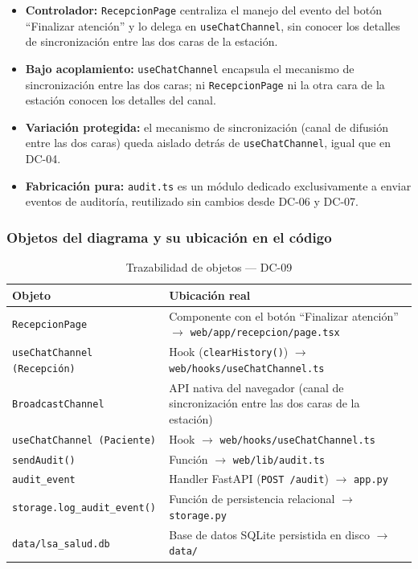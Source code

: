\begin{itemize}[leftmargin=*, itemsep=2pt]
    \item \textbf{Controlador:} \texttt{RecepcionPage} centraliza el manejo
    del evento del botón ``Finalizar atención'' y lo delega en
    \texttt{useChatChannel}, sin conocer los detalles de sincronización
    entre las dos caras de la estación.
    \item \textbf{Bajo acoplamiento:} \texttt{useChatChannel} encapsula el
    mecanismo de sincronización entre las dos caras; ni \texttt{RecepcionPage}
    ni la otra cara de la estación conocen los detalles del canal.
    \item \textbf{Variación protegida:} el mecanismo de sincronización
    (canal de difusión entre las dos caras) queda aislado detrás de
    \texttt{useChatChannel}, igual que en DC-04.
    \item \textbf{Fabricación pura:} \texttt{audit.ts} es un módulo dedicado
    exclusivamente a enviar eventos de auditoría, reutilizado sin cambios
    desde DC-06 y DC-07.
\end{itemize}

\subsubsection{Objetos del diagrama y su ubicación en el código}

\begin{table}[H]
\centering
\begin{tabularx}{\textwidth}{@{}l X@{}}
\toprule
\textbf{Objeto} & \textbf{Ubicación real} \\
\midrule
\texttt{RecepcionPage} & Componente con el botón ``Finalizar atención'' $\rightarrow$ \texttt{web/app/recepcion/page.tsx} \\
\texttt{useChatChannel (Recepción)} & Hook (\texttt{clearHistory()}) $\rightarrow$ \texttt{web/hooks/useChatChannel.ts} \\
\texttt{BroadcastChannel} & API nativa del navegador (canal de sincronización entre las dos caras de la estación) \\
\texttt{useChatChannel (Paciente)} & Hook $\rightarrow$ \texttt{web/hooks/useChatChannel.ts} \\
\texttt{sendAudit()} & Función $\rightarrow$ \texttt{web/lib/audit.ts} \\
\texttt{audit\_event} & Handler FastAPI (\texttt{POST /audit}) $\rightarrow$ \texttt{app.py} \\
\texttt{storage.log\_audit\_event()} & Función de persistencia relacional $\rightarrow$ \texttt{storage.py} \\
\texttt{data/lsa\_salud.db} & Base de datos SQLite persistida en disco $\rightarrow$ \texttt{data/} \\
\bottomrule
\end{tabularx}
\caption{Trazabilidad de objetos --- DC-09}
\label{tab:col-objetos-dc09}
\end{table}
